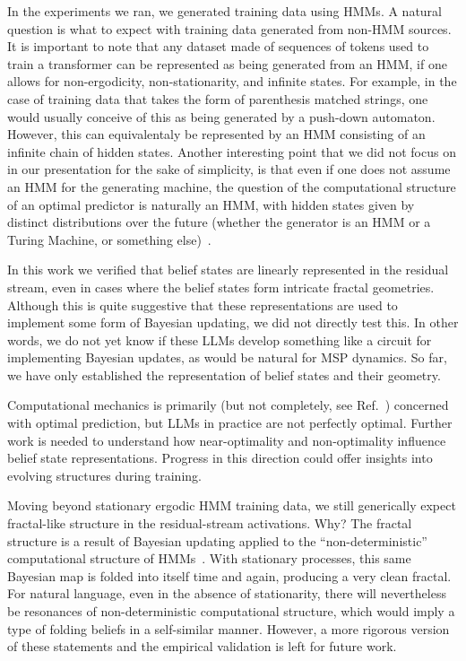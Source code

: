 \documentclass{article}
\begin{document}
In the experiments we ran, we generated training data using HMMs. A natural question is what to expect with training data generated from non-HMM sources. It is important to note that any dataset made of sequences of tokens used to train a transformer can be represented as being generated from an HMM, if one allows for non-ergodicity, non-stationarity, and infinite states. For example, in the case of training data that takes the form of parenthesis matched strings, one would usually conceive of this as being generated by a push-down automaton. However, this can equivalentaly be represented by an HMM consisting of an infinite chain of hidden states. Another interesting point that we did not focus on in our presentation for the sake of simplicity, is that even if one does not assume an HMM for the generating machine, the question of the computational structure of an optimal predictor is naturally an HMM, with hidden states given by distinct distributions over the future (whether the generator is an HMM or a Turing Machine, or something else)~\cite{Uppe97a}.

In this work we verified that belief states are linearly represented in the residual stream, even in cases where the belief states form intricate fractal geometries. Although this is quite suggestive that these representations are used to implement some form of Bayesian updating, we did not directly test this. In other words, we do not yet know if these LLMs develop something like a circuit for implementing Bayesian updates, as would be natural for MSP dynamics. So far, we have only established
the representation of belief states and their geometry.

Computational mechanics is primarily (but not completely, see Ref.~\cite{marzen2017nearly}) concerned with optimal prediction, but LLMs in practice are not perfectly optimal. Further work is needed to understand how near-optimality and non-optimality influence belief state representations.
Progress in this direction
could offer insights into
evolving structures during
training.

Moving beyond stationary ergodic HMM training data, we still generically expect fractal-like structure in the residual-stream activations. Why? The fractal structure is a result of Bayesian updating applied to the “non-deterministic” computational structure of HMMs~\cite{jurgens2021divergent}. With stationary processes, this same Bayesian map is folded into itself time and again, producing a very clean fractal. For natural language, even in the absence of stationarity, there will nevertheless be resonances of non-deterministic computational structure, which would imply a type of folding beliefs in a self-similar manner. However, a more rigorous version of these statements and the empirical validation is left for future work.
\end{document}
